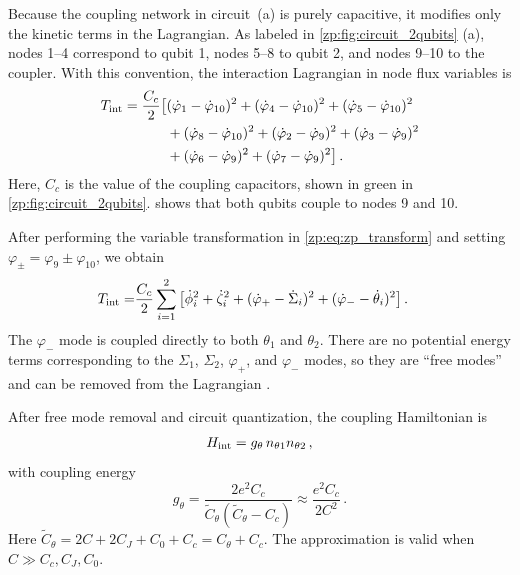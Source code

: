 Because the coupling network in circuit~(a) is purely capacitive, it modifies only the kinetic terms in the Lagrangian.
As labeled in \cref{zp:fig:circuit_2qubits} (a), nodes 1–4 correspond to qubit 1, nodes 5–8 to qubit 2, and nodes 9–10 to the coupler.
With this convention, the interaction Lagrangian in node flux variables is
\begin{align} \label{zp:eq:zp_interact_theta_lagrangian_1}
T_{\rm{int}}=\frac{C_{c}}{2} \big [
&(\dot{\varphi }_1-\dot{\varphi }_{10}){}^2
+(\dot{\varphi }_4-\dot{\varphi }_{10}){}^2
+(\dot{\varphi }_5-\dot{\varphi }_{10}){}^2     \nonumber\\
&+(\dot{\varphi }_8-\dot{\varphi }_{10}){}^2
+(\dot{\varphi }_2-\dot{\varphi }_9){}^2
+(\dot{\varphi }_3-\dot{\varphi }_9){}^2        \nonumber\\
&+(\dot{\varphi }_6-\dot{\varphi }_9){}^2
+(\dot{\varphi }_7-\dot{\varphi }_9){}^2 \big ]   \,.
\end{align}
Here, $C_c$ is the value of the coupling capacitors, shown in green in \cref{zp:fig:circuit_2qubits}.
 shows that both qubits couple to nodes 9 and 10.

After performing the variable transformation in \cref{zp:eq:zp_transform} and setting $\varphi_{\pm}=\varphi_9 \pm \varphi_{10}$, we obtain
\begin{align} \label{zp:eq:zp_interact_theta_lagrangian_2}
T_{\rm{int}}
=&\frac{C_c}{2}\sum_{i=1}^{2} \big [\dot{\phi}_i^2 + \dot{\zeta}_i^2
+(\dot{\varphi }_+ - \dot{\Sigma }_i)^2
+(\dot{\varphi }_- - \dot{\theta }_i)^2 \big ] \, .
\end{align}
The $\varphi_-$ mode is coupled directly to both $\theta_1$ and $\theta_2$.
There are no potential energy terms corresponding to the $\Sigma_1$, $\Sigma_2$, $\varphi_+$, and $\varphi_-$ modes, so they are ``free modes'' and can be removed from the Lagrangian \cite{groszkowskiScqubitsPythonPackage2021a,ding_free-mode_2021,chittaComputeraidedQuantizationNumerical2022a}.

After free mode removal and circuit quantization, the coupling Hamiltonian is
\begin{align} \label{zp:eq:zp_2_qubit_coupling_theta_2}
 H_{\rm{int}} =
g_\theta\, {n}_{\theta 1} {n}_{\theta 2} \, ,
\end{align}
with coupling energy
\begin{equation} \label{zp:eq:g_theta}
g_\theta =
\frac{2e^2C_c}{\tilde C_{\theta} (\tilde C_{\theta} - C_c)} \approx \frac{e^2C_c}{2C^2}\,.
\end{equation}
Here $\tilde C_{\theta}=2C + 2C_J +C_0 +C_c = C_{\theta} + C_c $.
The approximation is valid when $C\gg C_c, C_J, C_0$.

